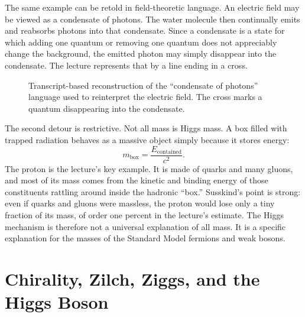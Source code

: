 The same example can be retold in field-theoretic language. An electric field may be viewed as a condensate of photons. The water molecule then continually emits and reabsorbs photons into that condensate. Since a condensate is a state for which adding one quantum or removing one quantum does not appreciably change the background, the emitted photon may simply disappear into the condensate. The lecture represents that by a line ending in a cross.

\begin{figure}
\centering
{}
\caption{Transcript-based reconstruction of the ``condensate of photons'' language used to reinterpret the electric field. The cross marks a quantum disappearing into the condensate.}
\end{figure}

The second detour is restrictive. Not all mass is Higgs mass. A box filled with trapped radiation behaves as a massive object simply because it stores energy:
\begin{equation}
m_{\text{box}}=\frac{E_{\text{contained}}}{c^{2}}.
\end{equation}
The proton is the lecture's key example. It is made of quarks and many gluons, and most of its mass comes from the kinetic and binding energy of those constituents rattling around inside the hadronic ``box.'' Susskind's point is strong: even if quarks and gluons were massless, the proton would lose only a tiny fraction of its mass, of order one percent in the lecture's estimate. The Higgs mechanism is therefore not a universal explanation of all mass. It is a specific explanation for the masses of the Standard Model fermions and weak bosons.

\section{Chirality, Zilch, Ziggs, and the Higgs Boson}

